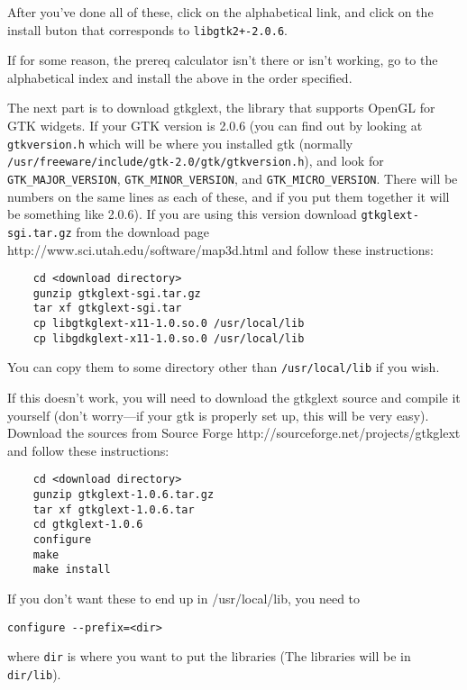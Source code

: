 After you've done all of these, click on the alphabetical link, and click on
the install buton that corresponds to \verb|libgtk2+-2.0.6|.

If for some reason, the prereq calculator isn't there or isn't working, go
to the alphabetical index and install the above in the order specified.


The next part is to download gtkglext, the library that supports OpenGL for
GTK widgets.  If your GTK version is 2.0.6 (you can find out by looking at
\texttt{gtkversion.h} which will be where you installed gtk (normally
\texttt{/usr/freeware/include/gtk-2.0/gtk/gtkversion.h}), and look for
\verb|GTK_MAJOR_VERSION|, \verb|GTK_MINOR_VERSION|, and
\verb|GTK_MICRO_VERSION|.  There will be numbers on the same lines as each
of these, and if you put them together it will be something like 2.0.6).
If you are using this version download \texttt{gtkglext-sgi.tar.gz} from
the \map{} download page
{http://www.sci.utah.edu/software/map3d.html} and follow these
instructions:

\begin{verbatim}
    cd <download directory>
    gunzip gtkglext-sgi.tar.gz
    tar xf gtkglext-sgi.tar
    cp libgtkglext-x11-1.0.so.0 /usr/local/lib
    cp libgdkglext-x11-1.0.so.0 /usr/local/lib
\end{verbatim}

You can copy them to some directory other than \texttt{/usr/local/lib} if
you wish.

If this doesn't work, you will need to download the gtkglext source and
compile it yourself (don't worry---if your gtk is properly set up, this
will be very easy).  Download the sources from Source Forge
  {http://sourceforge.net/projects/gtkglext} and follow these
  instructions:

\begin{verbatim}
    cd <download directory>
    gunzip gtkglext-1.0.6.tar.gz
    tar xf gtkglext-1.0.6.tar
    cd gtkglext-1.0.6
    configure
    make
    make install
\end{verbatim}


If you don't want these to end up in /usr/local/lib, you need to

\begin{verbatim}
configure --prefix=<dir>
\end{verbatim}

where \texttt{dir} is where you want to put the libraries (The libraries
will be in \texttt{dir/lib}).

